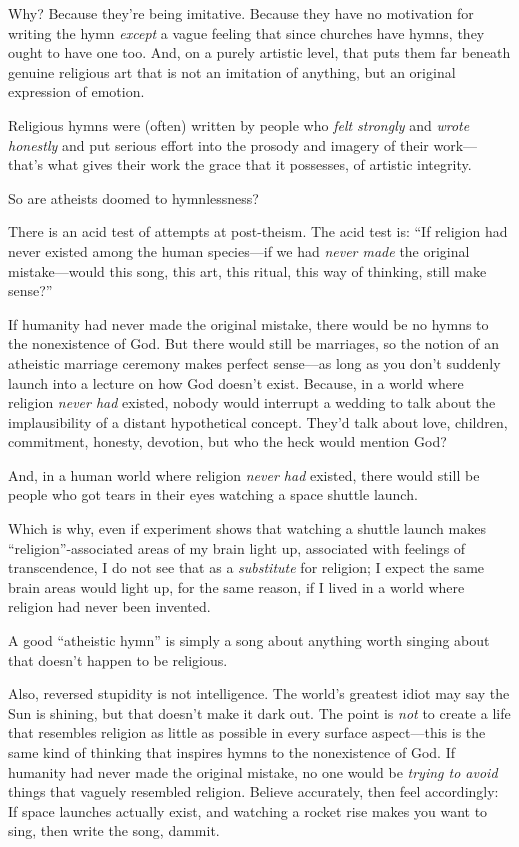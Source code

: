 {
 Why? Because they're being imitative. Because they
have no motivation for writing the hymn \textit{except} a vague feeling
that since churches have hymns, they ought to have one too. And, on a
purely artistic level, that puts them far beneath genuine religious art
that is not an imitation of anything, but an original expression of
emotion.}

{
 Religious hymns were (often) written by people who \textit{felt
strongly} and \textit{wrote honestly} and put serious effort into the
prosody and imagery of their work---that's what gives
their work the grace that it possesses, of artistic integrity.}

{
 So are atheists doomed to hymnlessness?}

{
 There is an acid test of attempts at post-theism. The acid test
is: ``If religion had never existed among the human
species---if we had \textit{never made} the original mistake---would
this song, this art, this ritual, this way of thinking, still make
sense?''}

{
 If humanity had never made the original mistake, there would be no
hymns to the nonexistence of God. But there would still be marriages,
so the notion of an atheistic marriage ceremony makes perfect
sense---as long as you don't suddenly launch into a
lecture on how God doesn't exist. Because, in a world
where religion \textit{never had} existed, nobody would interrupt a
wedding to talk about the implausibility of a distant hypothetical
concept. They'd talk about love, children, commitment,
honesty, devotion, but who the heck would mention God?}

{
 And, in a human world where religion \textit{never had} existed,
there would still be people who got tears in their eyes watching a
space shuttle launch.}

{
 Which is why, even if experiment shows that watching a shuttle
launch makes ``religion''-associated
areas of my brain light up, associated with feelings of transcendence,
I do not see that as a \textit{substitute} for religion; I expect the
same brain areas would light up, for the same reason, if I lived in a
world where religion had never been invented.}

{
 A good ``atheistic hymn'' is
simply a song about anything worth singing about that
doesn't happen to be religious.}

{
 Also, reversed stupidity is not intelligence. The
world's greatest idiot may say the Sun is shining, but
that doesn't make it dark out. The point is
\textit{not} to create a life that resembles religion as little as
possible in every surface aspect---this is the same kind of thinking
that inspires hymns to the nonexistence of God. If humanity had never
made the original mistake, no one would be \textit{trying to avoid}
things that vaguely resembled religion. Believe accurately, then feel
accordingly: If space launches actually exist, and watching a rocket
rise makes you want to sing, then write the song, dammit.}

